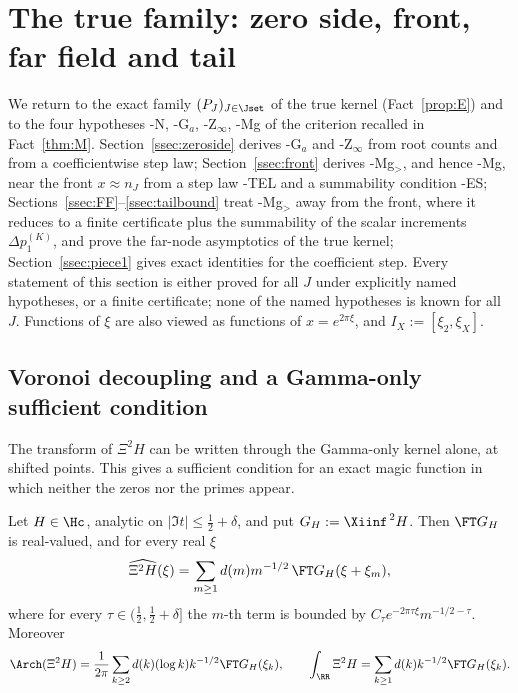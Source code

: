 \section{The true family: zero side, front, far field and tail}\label{sec:true}\label{sec:tail}

We return to the exact family $(P_J)_{J\in\Jset}$ of the true kernel (Fact~\ref{prop:E}) and to the four hypotheses
\hyp{N}, \hyp{G$_a$}, \hyp{Z$_\infty$}, \hyp{Mg} of the criterion recalled in Fact~\ref{thm:M}. Section~\ref{ssec:zeroside}
derives \hyp{G$_a$} and \hyp{Z$_\infty$} from root counts and from a coefficientwise step law; Section~\ref{ssec:front}
derives \hyp{Mg$_>$}, and hence \hyp{Mg}, near the front $x\approx n_J$ from a step law \hyp{TEL} and a summability condition \hyp{ES};
Sections~\ref{ssec:FF}--\ref{ssec:tailbound} treat \hyp{Mg$_>$} away from the front, where it reduces to a finite
certificate plus the summability of the scalar increments $\Delta p_1^{(K)}$, and prove the far-node asymptotics of
the true kernel; Section~\ref{ssec:piece1} gives exact identities for the coefficient step. Every statement of this
section is either proved for all $J$ under explicitly named hypotheses, or a finite certificate; none of the named
hypotheses is known for all $J$. Functions of $\xi$ are also viewed as functions of $x=e^{2\pi\xi}$, and
$I_X:=[\xi_2,\xi_X]$.

\subsection{Voronoi decoupling and a Gamma-only sufficient condition}\label{ssec:voronoi}

The transform of $\Xi^2H$ can be written through the Gamma-only kernel alone, at shifted points. This gives a
sufficient condition for an exact magic function in which neither the zeros nor the primes appear.

\begin{theorem}\label{thm:voronoi}
Let $H\in\Hc$, analytic on $\lvert\Im t\rvert\le\frac12+\delta$, and put $G_H:=\Xiinf^{\,2}H$. Then
$\FT G_H$ is real-valued, and for every real $\xi$
\[
\widehat{\Xi^2H}(\xi)=\sum_{m\ge1}d(m)m^{-1/2}\,\FT G_H(\xi+\xi_m),
\]
where for every $\tau\in(\frac12,\frac12+\delta]$ the $m$-th term is bounded by
$C_\tau e^{-2\pi\tau\xi}m^{-1/2-\tau}$. Moreover
\[
\Arch(\Xi^2H)=\frac1{2\pi}\sum_{k\ge2}d(k)(\log k)k^{-1/2}\FT G_H(\xi_k),\qquad
\int_\RR\Xi^2H=\sum_{k\ge1}d(k)k^{-1/2}\FT G_H(\xi_k).
\]
\end{theorem}

